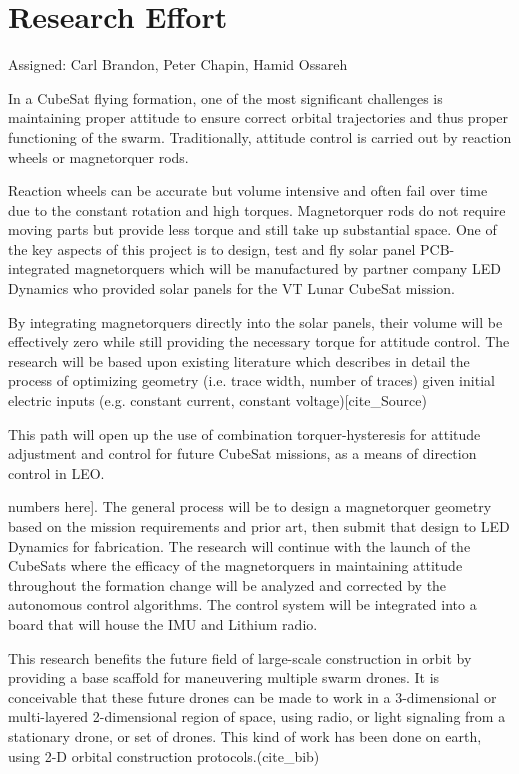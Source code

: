 \section{Research Effort}
Assigned: Carl Brandon, Peter Chapin, Hamid Ossareh

In a CubeSat flying formation, one of the most significant challenges
is maintaining proper attitude to ensure correct orbital trajectories
and thus proper functioning of the swarm. Traditionally, attitude
control is carried out by reaction wheels or magnetorquer
rods.

Reaction wheels can be accurate but volume intensive and often
fail over time due to the constant rotation and high
torques. Magnetorquer rods do not require moving parts but provide
less torque and still take up substantial space. One of the key
aspects of this project is to design, test and fly solar panel
PCB-integrated magnetorquers which will be manufactured by partner
company LED Dynamics who provided solar panels for the VT Lunar
CubeSat mission.

By integrating magnetorquers directly into the solar
panels, their volume will be effectively zero while still providing
the necessary torque for attitude control. The research will be based
upon existing literature which describes in detail the process of
optimizing geometry (i.e. trace width, number of traces) given initial
electric inputs (e.g. constant current, constant voltage)[cite_Source)

This path will open up the use of combination torquer-hysteresis for attitude adjustment and control for future CubeSat missions, as a means of direction control in LEO.

  numbers here]. The general process will be to design a magnetorquer geometry based on the mission requirements and prior art, then submit that design to LED Dynamics for fabrication. The research will continue with the launch of the CubeSats where the efficacy of the magnetorquers in maintaining attitude throughout the formation change will be analyzed and corrected by the autonomous control algorithms. The control system will be integrated into a board that will house the IMU and Lithium radio.

This research benefits the future field of large-scale construction in orbit by providing a base scaffold for maneuvering multiple swarm drones. It is conceivable that these  future drones can be made to work in a 3-dimensional or multi-layered 2-dimensional region of space, using radio, or light signaling from a stationary drone, or set of drones. This kind of work has been done on earth, using 2-D orbital construction protocols.(cite_bib)

